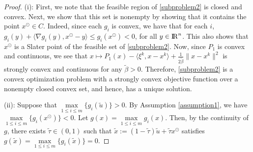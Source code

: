\documentclass[10pt]{article}
\numberwithin{equation}{section}
\def\R{{\rm I\!R}}
\def\xfeas{x^\odot}
\begin{document}
\begin{proof}
(i): First, we note that the feasible region of \eqref{subproblem2} is closed and convex. Next, we show that this set is nonempty by showing that it contains the point $\xfeas\in C$. Indeed, since each $g_i$ is convex, we have that for each $i$, $g_i(y) + \langle \nabla g_i(y),\xfeas - y\rangle\leq g_i(\xfeas) < 0$, for all $y\in \R^n$. This also shows that $\xfeas$ is a Slater point of the feasible set of \eqref{subproblem2}. Now, since $P_1$ is convex and continuous, we see that $x\mapsto P_1(x) - \langle \xi^k, x - x^k\rangle + \frac{1}{2\widetilde{\beta}}\|x - x^k\|^2$ is strongly convex and continuous for any $\widetilde{\beta} > 0$. Therefore, \eqref{subproblem2} is a convex optimization problem with a strongly convex objective function over a nonempty closed convex set, and hence, has a unique solution.

(ii): Suppose that $\max\limits_{1 \le i \le m} \{g_i(\widetilde{u})\} > 0$. By Assumption \ref{assumption1}, we have $\max\limits_{1 \le i \le m} \{g_i(\xfeas)\} < 0$. Let $g(x)= \max\limits_{1 \le i \le m} g_i(x)$. Then, by the continuity of $g$, there exists $\widetilde{\tau}\in (0, 1)$ such that $\widetilde{x} := (1 - \widetilde{\tau})\widetilde{u} + \widetilde{\tau} \xfeas$ satisfies $g( \widetilde{x})=\max\limits_{1 \le i \le m} \{g_i(\widetilde{x})\} = 0$.


\end{proof}
\end{document}
